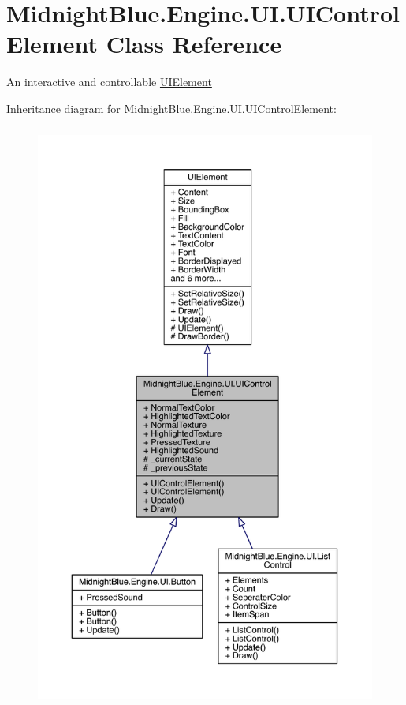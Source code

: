 \hypertarget{class_midnight_blue_1_1_engine_1_1_u_i_1_1_u_i_control_element}{}\section{Midnight\+Blue.\+Engine.\+U\+I.\+U\+I\+Control\+Element Class Reference}
\label{class_midnight_blue_1_1_engine_1_1_u_i_1_1_u_i_control_element}


An interactive and controllable \hyperlink{class_midnight_blue_1_1_engine_1_1_u_i_1_1_u_i_element}{U\+I\+Element}  




Inheritance diagram for Midnight\+Blue.\+Engine.\+U\+I.\+U\+I\+Control\+Element\+:
\nopagebreak
\begin{figure}[H]
\begin{center}
\leavevmode
\includegraphics[height=550pt]{class_midnight_blue_1_1_engine_1_1_u_i_1_1_u_i_control_element__inherit__graph}
\end{center}
\end{figure}


